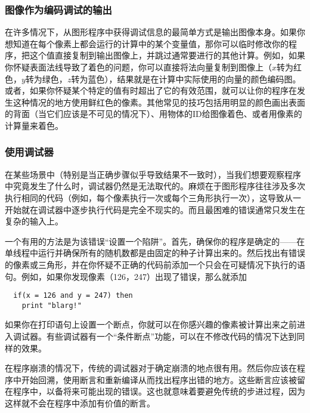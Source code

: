 \documentclass[lang=cn,12pt,marginpar=margintrue]{elegantbook}
\begin{document}
\subsubsection{图像作为编码调试的输出}

在许多情况下，从图形程序中获得调试信息的最简单方式是输出图像本身。如果你想知道在每个像素上都会运行的计算中的某个变量值，那你可以临时修改你的程序，把这个值直接复制到输出图像上，并跳过通常要进行的其他计算。例如，如果你怀疑表面法线导致了着色的问题，你可以直接将法向量复制到图像上（$x$转为红色，$y$转为绿色，$z$转为蓝色），结果就是在计算中实际使用的向量的颜色编码图。或者，如果你怀疑某个特定的值有时超出了它的有效范围，就可以让你的程序在发生这种情况的地方使用鲜红色的像素。其他常见的技巧包括用明显的颜色画出表面的背面（当它们应该是不可见的情况下）、用物体的ID给图像着色、或者用像素的计算量来着色。

\subsubsection{使用调试器}

在某些场景中（特别是当正确步骤似乎导致结果不一致时），当我们想要观察程序中究竟发生了什么时，调试器仍然是无法取代的。麻烦在于图形程序往往涉及多次执行相同的代码（例如，每个像素执行一次或每个三角形执行一次），这导致从一开始就在调试器中逐步执行代码是完全不现实的。而且最困难的错误通常只发生在复杂的输入上。

一个有用的方法是为该错误“设置一个陷阱”。首先，确保你的程序是确定的——在单线程中运行并确保所有的随机数都是由固定的种子计算出来的。然后找出有错误的像素或三角形，并在你怀疑不正确的代码前添加一个只会在可疑情况下执行的语句。例如，如果你发现像素（126，247）出现了错误，那么就添加
\begin{lstlisting}
  if(x = 126 and y = 247) then
    print "blarg!"
\end{lstlisting}
如果你在打印语句上设置一个断点，你就可以在你感兴趣的像素被计算出来之前进入调试器。有些调试器有一个“条件断点”功能，可以在不修改代码的情况下达到同样的效果。

在程序崩溃的情况下，传统的调试器对于确定崩溃的地点很有用。然后你应该在程序中开始回溯，使用断言和重新编译从而找出程序出错的地方。这些断言应该被留在程序中，以备将来可能出现的错误。这也就意味着要避免传统的步进过程，因为这样就不会在程序中添加有价值的断言。
\end{document}
